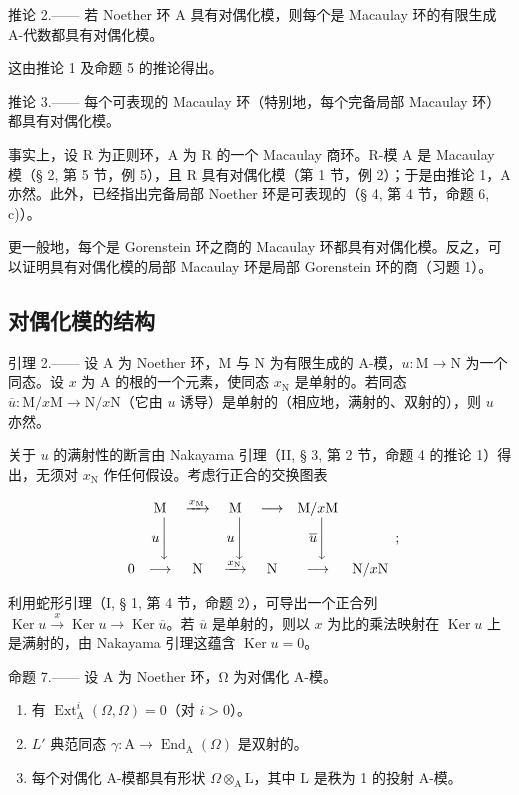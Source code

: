 推论 2.—— 若 Noether 环 A 具有对偶化模，则每个是 Macaulay 环的有限生成 A-代数都具有对偶化模。

这由推论 1 及命题 5 的推论得出。

推论 3.—— 每个可表现的 Macaulay 环（特别地，每个完备局部 Macaulay 环）都具有对偶化模。

事实上，设 R 为正则环，A 为 R 的一个 Macaulay 商环。R-模 A 是 Macaulay 模（§ 2, 第 5 节，例 5），且 R 具有对偶化模（第 1 节，例 2）；于是由推论 1，A 亦然。此外，已经指出完备局部 Noether 环是可表现的（§ 4, 第 4 节，命题 6, c)）。

更一般地，每个是 Gorenstein 环之商的 Macaulay 环都具有对偶化模。反之，可以证明具有对偶化模的局部 Macaulay 环是局部 Gorenstein 环的商（习题 1）。

\subsection{对偶化模的结构}

引理 2.—— 设 A 为 Noether 环，M 与 N 为有限生成的 A-模，\(u: \mathrm{M} \to \mathrm{N}\) 为一个同态。设 \(x\) 为 A 的根的一个元素，使同态 \(x_{\mathrm{N}}\) 是单射的。若同态 \(\overline{u}: \mathrm{M}/x\mathrm{M} \to \mathrm{N}/x\mathrm{N}\)（它由 \(u\) 诱导）是单射的（相应地，满射的、双射的），则 \(u\) 亦然。

关于 \(u\) 的满射性的断言由 Nakayama 引理（II, § 3, 第 2 节，命题 4 的推论 1）得出，无须对 \(x_{\mathrm{N}}\) 作任何假设。考虑行正合的交换图表

\[
\begin{array}{c c c c c c c} & \mathrm{M} & \xrightarrow {x _ {\mathrm{M}}} & \mathrm{M} & \longrightarrow & \mathrm{M} / x \mathrm{M} \\ & u \Bigg \downarrow & & u \Bigg \downarrow & & \overline {{u}} \Bigg \downarrow \\ 0 & \longrightarrow & \mathrm{N} & \xrightarrow {x _ {\mathrm{N}}} & \mathrm{N} & \longrightarrow & \mathrm{N} / x \mathrm{N} \end{array} ;
\]

利用蛇形引理（I, § 1, 第 4 节，命题 2），可导出一个正合列 \(\operatorname{Ker} u \xrightarrow{x} \operatorname{Ker} u \longrightarrow \operatorname{Ker} \overline{u}\)。若 \(\overline{u}\) 是单射的，则以 \(x\) 为比的乘法映射在 \(\operatorname{Ker} u\) 上是满射的，由 Nakayama 引理这蕴含 \(\operatorname{Ker} u = 0\)。

命题 7.—— 设 A 为 Noether 环，Ω 为对偶化 A-模。

\begin{enumerate}
\def\labelenumi{\alph{enumi})}
\item
  有 \(\operatorname{Ext}_{\mathrm{A}}^{i}(\Omega, \Omega) = 0\)（对 \(i > 0\)）。
\item
  \(L'\) 典范同态 \(\gamma : \mathrm{A} \to \operatorname{End}_{\mathrm{A}}(\Omega)\) 是双射的。
\item
  每个对偶化 A-模都具有形状 \(\Omega\otimes_{\mathrm{A}}\mathrm{L}\)，其中 \(\mathrm{L}\) 是秩为 1 的投射 A-模。
\end{enumerate}


